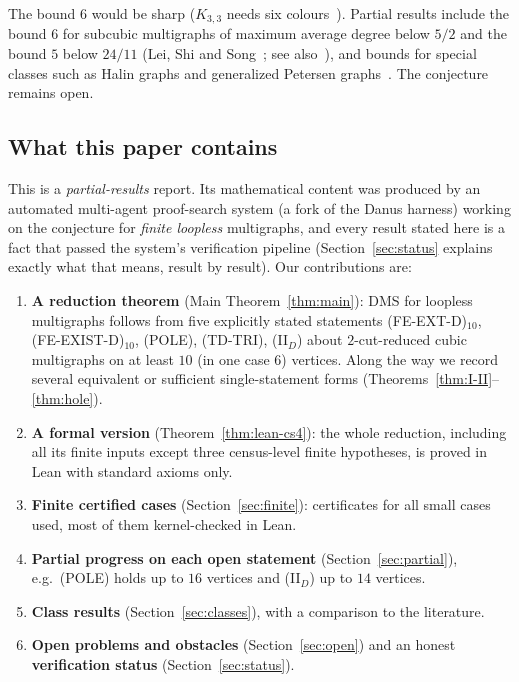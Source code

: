 \documentclass[11pt]{amsart}
\theoremstyle{definition}
\theoremstyle{remark}
\newcommand{\hyp}[1]{\textup{(#1)}}
\newcommand{\Lean}{\textsf{Lean}}
\begin{document}
The bound $6$ would be sharp ($K_{3,3}$ needs six colours~\cite{DMS13}). Partial results include the bound $6$ for subcubic multigraphs of maximum average degree below $5/2$ and the bound $5$ below $24/11$ (Lei, Shi and Song~\cite{LSS18}; see also~\cite{LSSW18}), and bounds for special classes such as Halin graphs and generalized Petersen graphs~\cite{HLW20,Zhu21,OD24}. The conjecture remains open.

\subsection*{What this paper contains}
This is a \emph{partial-results} report. Its mathematical content was produced by an automated multi-agent proof-search system (a fork of the \textsf{Danus} harness) working on the conjecture for \emph{finite loopless} multigraphs, and every result stated here is a fact that passed the system's verification pipeline (Section~\ref{sec:status} explains exactly what that means, result by result). Our contributions are:
\begin{enumerate}[label=(\arabic*)]
\item \textbf{A reduction theorem} (Main Theorem~\ref{thm:main}): DMS for loopless multigraphs follows from five explicitly stated statements \hyp{FE-EXT-D}$_{10}$, \hyp{FE-EXIST-D}$_{10}$, \hyp{POLE}, \hyp{TD-TRI}, \hyp{II$_D$} about $2$-cut-reduced cubic multigraphs on at least $10$ (in one case $6$) vertices. Along the way we record several equivalent or sufficient single-statement forms (Theorems~\ref{thm:I-II}--\ref{thm:hole}).
\item \textbf{A formal version} (Theorem~\ref{thm:lean-cs4}): the whole reduction, including all its finite inputs except three census-level finite hypotheses, is proved in \Lean{} with standard axioms only.
\item \textbf{Finite certified cases} (Section~\ref{sec:finite}): certificates for all small cases used, most of them kernel-checked in \Lean.
\item \textbf{Partial progress on each open statement} (Section~\ref{sec:partial}), e.g.\ \hyp{POLE} holds up to $16$ vertices and \hyp{II$_D$} up to $14$ vertices.
\item \textbf{Class results} (Section~\ref{sec:classes}), with a comparison to the literature.
\item \textbf{Open problems and obstacles} (Section~\ref{sec:open}) and an honest \textbf{verification status} (Section~\ref{sec:status}).
\end{enumerate}
\end{document}
